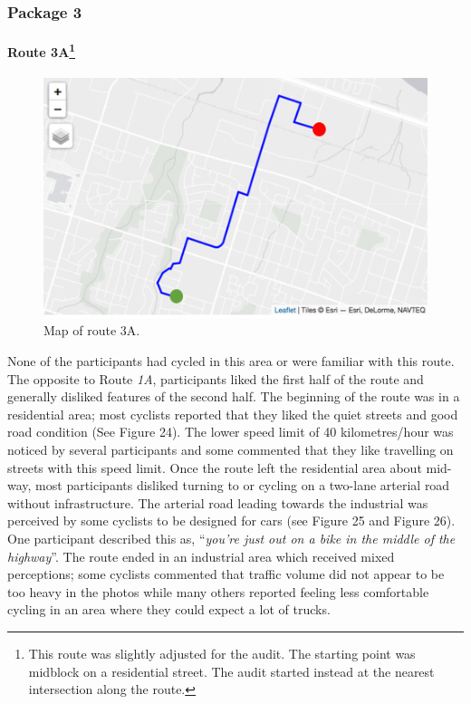 \documentclass[]{elsarticle} %
\begin{document}
\hypertarget{package-3-1}{%
\subsubsection{Package 3}\label{package-3-1}}

\hypertarget{route-3a}{%
\paragraph[Route 3A]{\texorpdfstring{Route 3A\footnote{This route was
  slightly adjusted for the audit. The starting point was midblock on a
  residential street. The audit started instead at the nearest
  intersection along the route.}}{Route 3A}}\label{route-3a}}

\begin{figure}

{\centering \includegraphics[width=0.65\linewidth]{Route 3A} 

}

\caption{Map of route 3A.}\label{fig:figure-23}
\end{figure}

None of the participants had cycled in this area or were familiar with
this route. The opposite to Route \emph{1A}, participants liked the
first half of the route and generally disliked features of the second
half. The beginning of the route was in a residential area; most
cyclists reported that they liked the quiet streets and good road
condition (See Figure 24). The lower speed limit of 40 kilometres/hour
was noticed by several participants and some commented that they like
travelling on streets with this speed limit. Once the route left the
residential area about mid-way, most participants disliked turning to or
cycling on a two-lane arterial road without infrastructure. The arterial
road leading towards the industrial was perceived by some cyclists to be
designed for cars (see Figure 25 and Figure 26). One participant
described this as, ``\emph{you're just out on a bike in the middle of
the highway}''. The route ended in an industrial area which received
mixed perceptions; some cyclists commented that traffic volume did not
appear to be too heavy in the photos while many others reported feeling
less comfortable cycling in an area where they could expect a lot of
trucks.
\end{document}
